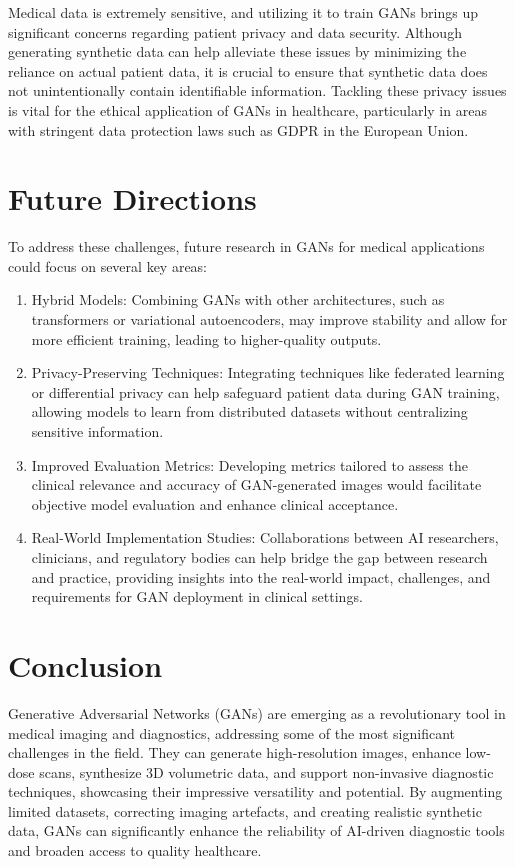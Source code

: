 \documentclass[12pt]{article}
\begin{document}
Medical data is extremely sensitive, and utilizing it to train GANs brings up significant concerns regarding patient privacy and data security. Although generating synthetic data can help alleviate these issues by minimizing the reliance on actual patient data, it is crucial to ensure that synthetic data does not unintentionally contain identifiable information. Tackling these privacy issues is vital for the ethical application of GANs in healthcare, particularly in areas with stringent data protection laws such as GDPR in the European Union.

\section{Future Directions}
To address these challenges, future research in GANs for medical applications could focus on several key areas:

\begin{enumerate}
    
\item Hybrid Models: Combining GANs with other architectures, such as transformers or variational autoencoders, may improve stability and allow for more efficient training, leading to higher-quality outputs.
\item Privacy-Preserving Techniques: Integrating techniques like federated learning or differential privacy can help safeguard patient data during GAN training, allowing models to learn from distributed datasets without centralizing sensitive information.
\item Improved Evaluation Metrics: Developing metrics tailored to assess the clinical relevance and accuracy of GAN-generated images would facilitate objective model evaluation and enhance clinical acceptance.
\item Real-World Implementation Studies: Collaborations between AI researchers, clinicians, and regulatory bodies can help bridge the gap between research and practice, providing insights into the real-world impact, challenges, and requirements for GAN deployment in clinical settings.
\end{enumerate}

\section{Conclusion}

Generative Adversarial Networks (GANs) are emerging as a revolutionary tool in medical imaging and diagnostics, addressing some of the most significant challenges in the field. They can generate high-resolution images, enhance low-dose scans, synthesize 3D volumetric data, and support non-invasive diagnostic techniques, showcasing their impressive versatility and potential. By augmenting limited datasets, correcting imaging artefacts, and creating realistic synthetic data, GANs can significantly enhance the reliability of AI-driven diagnostic tools and broaden access to quality healthcare.  
\end{document}
